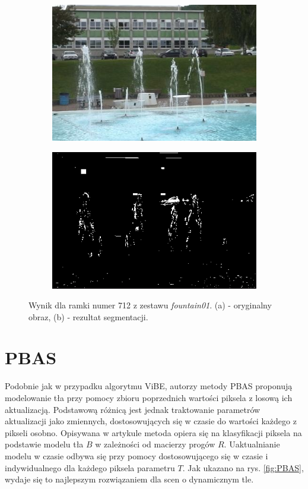 \begin{figure}[!h]
\centering
\begin{subfigure}[b]{0.4\textwidth}
\includegraphics[width=\textwidth]{img/GMMIn}
\caption{}
\end{subfigure}
\quad
\begin{subfigure}[b]{0.4\textwidth}
\includegraphics[width=\textwidth]{img/ViBEOut}
\caption{}
\end{subfigure}
\caption{Wynik dla ramki numer 712 z zestawu \textit{fountain01}. (a) - oryginalny obraz, (b) - rezultat segmentacji.\label{fig:ViBE}}
\end{figure}


\section{PBAS}
Podobnie jak w przypadku algorytmu ViBE, autorzy metody PBAS proponują modelowanie tła przy pomocy zbioru poprzednich wartości piksela z losową ich aktualizacją. Podstawową różnicą jest jednak traktowanie parametrów aktualizacji jako zmiennych, dostosowujących się w czasie do wartości każdego z pikseli osobno. Opisywana w artykule \cite{hofmann2012background} metoda opiera się na klasyfikacji piksela na podstawie modelu tła $B$ w zależności od macierzy progów $R$. Uaktualnianie modelu w czasie odbywa się przy pomocy dostosowującego się w czasie i indywidualnego dla każdego piksela parametru $T$. Jak ukazano na rys. \ref{fig:PBAS}, wydaje się to najlepszym rozwiązaniem dla scen o dynamicznym tle.
